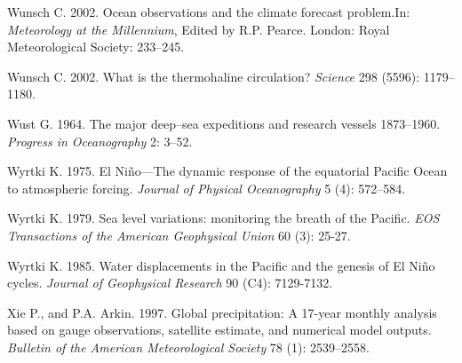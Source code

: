 \begin{thebibliography}{999}
Wunsch C.  2002. Ocean observations and the climate forecast
  problem.In: \textit{Meteorology at the Millennium}, Edited by
  R.P. Pearce. London: Royal Meteorological Society: 233--245.
%

Wunsch C.  2002. What is the thermohaline circulation?
  \textit{Science} 298 (5596): 1179--1180.
%

Wust G.  1964. The major deep--sea expeditions and research
  vessels 1873--1960. \textit{Progress in Oceanography} 2: 3--52.
%

Wyrtki K.  1975. El Ni\~{n}o---The dynamic response of the equatorial
Pacific Ocean to atmospheric forcing. \textit{Journal of Physical
  Oceanography} 5 (4): 572--584.
%

Wyrtki K.  1979. Sea level variations: monitoring the breath of the
Pacific. \textit{EOS Transactions of the American Geophysical Union}
60 (3): 25-27.
%

Wyrtki K.  1985. Water displacements in the Pacific and the genesis of
El Ni\~{n}o cycles. \textit{Journal of Geophysical Research} 90 (C4):
7129-7132.
%

Xie P., and P.A. Arkin.  1997. Global precipitation: A 17-year monthly
analysis based on gauge observations, satellite estimate, and
numerical model outputs. \textit{ Bulletin of the American
  Meteorological Society} 78 (1): 2539--2558.
%


\end{thebibliography}
